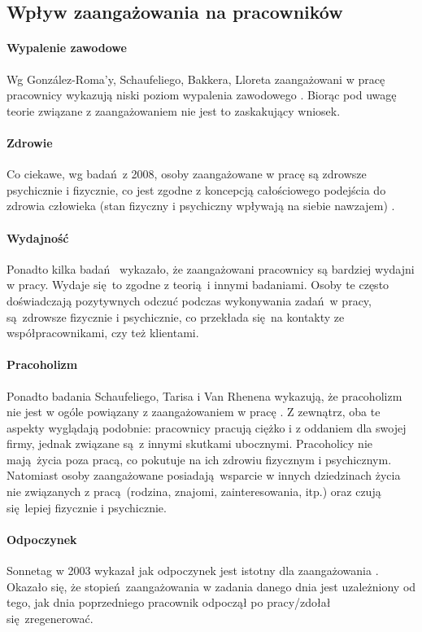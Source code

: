 \subsection{Wpływ zaangażowania na pracowników}
\label{sec:thoery-eng-infl2}
\paragraph{Wypalenie zawodowe}
Wg González-Roma'y, Schaufeliego, Bakkera, Lloreta zaangażowani w pracę pracownicy wykazują niski poziom wypalenia zawodowego \citep{gonzlez2006burnout}. Biorąc pod uwagę teorie związane z zaangażowaniem nie jest to zaskakujący wniosek.
\paragraph{Zdrowie}
Co ciekawe, wg badań z 2008, osoby zaangażowane w pracę są zdrowsze psychicznie i fizycznie, co jest zgodne z koncepcją całościowego podejścia do zdrowia człowieka (stan fizyczny i psychiczny wpływają na siebie nawzajem) \citep{schaufeli2008workaholism}.
\paragraph{Wydajność}
Ponadto kilka badań \citep{xanthopoulou2008working,xanthopoulou2009work} wykazało, że zaangażowani pracownicy są bardziej wydajni w pracy. Wydaje się to zgodne z teorią i innymi badaniami. Osoby te często doświadczają pozytywnych odczuć podczas wykonywania zadań w pracy, są zdrowsze fizycznie i psychicznie, co przekłada się na kontakty ze współpracownikami, czy też klientami.
\paragraph{Pracoholizm}
Ponadto badania Schaufeliego, Tarisa i Van Rhenena wykazują, że pracoholizm nie jest w ogóle powiązany z zaangażowaniem w pracę \citep{schaufeli2008workaholism}. Z zewnątrz, oba te aspekty wyglądają podobnie: pracownicy pracują ciężko i z oddaniem dla swojej firmy, jednak związane są z innymi skutkami ubocznymi. Pracoholicy nie mają życia poza pracą, co pokutuje na ich zdrowiu fizycznym i psychicznym. Natomiast osoby zaangażowane posiadają wsparcie w innych dziedzinach życia nie związanych z pracą (rodzina,
znajomi, zainteresowania, itp.) oraz czują się lepiej fizycznie i psychicznie.
\paragraph{Odpoczynek}
Sonnetag w 2003 wykazał jak odpoczynek jest istotny dla zaangażowania \citep{sonnentag2003recovery}. Okazało się, że stopień zaangażowania w zadania danego dnia jest uzależniony od tego, jak dnia poprzedniego pracownik odpoczął po pracy/zdołał się zregenerować.
